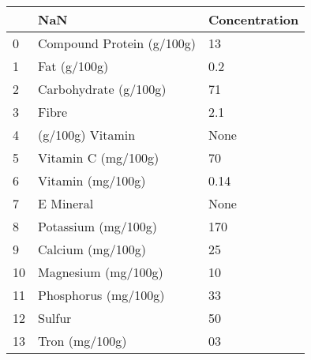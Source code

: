 \begin{tabular}{lll}
\toprule
{} &                        NaN & Concentration \\
\midrule
0  &  Compound Protein (g/100g) &            13 \\
1  &               Fat (g/100g) &           0.2 \\
2  &      Carbohydrate (g/100g) &            71 \\
3  &                      Fibre &           2.1 \\
4  &           (g/100g) Vitamin &          None \\
5  &        Vitamin C (mg/100g) &            70 \\
6  &          Vitamin (mg/100g) &          0.14 \\
7  &                  E Mineral &          None \\
8  &        Potassium (mg/100g) &           170 \\
9  &          Calcium (mg/100g) &            25 \\
10 &        Magnesium (mg/100g) &            10 \\
11 &       Phosphorus (mg/100g) &            33 \\
12 &                     Sulfur &            50 \\
13 &             Tron (mg/100g) &            03 \\
\bottomrule
\end{tabular}
